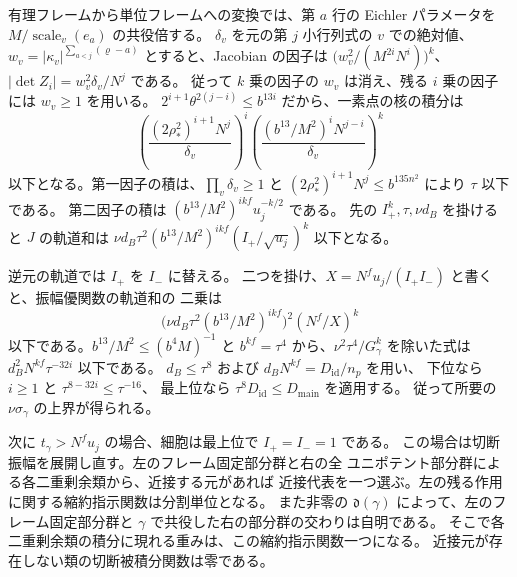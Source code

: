 有理フレームから単位フレームへの変換では、第 \(a\) 行の
Eichler パラメータを \(M/\operatorname{scale}_v(e_a)\) の共役倍する。
\(\delta_v\) を元の第 \(j\) 小行列式の \(v\) での絶対値、
\(w_v=|\kappa_v|^{\sum_{a<j}(\varrho-a)}\) とすると、Jacobian の因子は
\(\bigl(w_v^2/(M^{2i}N^i)\bigr)^k\)、\(|\det Z_i|=w_v^2\delta_v/N^j\) である。
従って \(k\) 乗の因子の \(w_v\) は消え、残る \(i\) 乗の因子には
\(w_v\ge1\) を用いる。
\(2^{i+1}\theta^{2(j-i)}\le b^{13i}\) だから、一素点の核の積分は
\[
 \left(\frac{(2\rho_\ast^2)^{i+1}N^j}{\delta_v}\right)^i
 \left(\frac{(b^{13}/M^2)^i N^{j-i}}{\delta_v}\right)^k
\]
以下となる。第一因子の積は、\(\prod_v\delta_v\ge1\) と
\((2\rho_\ast^2)^{i+1}N^j\le b^{135n^2}\) により \(\tau\) 以下である。
第二因子の積は \((b^{13}/M^2)^{ikf}u_j^{-k/2}\) である。
先の \(I_+^k,\tau,\nu d_B\) を掛けると \(J\) の軌道和は
\(\nu d_B\tau^2(b^{13}/M^2)^{ikf}(I_+/\sqrt{u_j})^k\) 以下となる。

逆元の軌道では \(I_+\) を \(I_-\) に替える。
二つを掛け、\(X=N^fu_j/(I_+I_-)\) と書くと、振幅優関数の軌道和の
二乗は
\[
  \bigl(\nu d_B\tau^2(b^{13}/M^2)^{ikf}\bigr)^2(N^f/X)^k
\]
以下である。\(b^{13}/M^2\le(b^4M)^{-1}\) と
\(b^{kf}=\tau^4\) から、\(\nu^2\tau^4/G_\gamma^k\) を除いた式は
\(d_B^2N^{kf}\tau^{-32i}\) 以下である。
\(d_B\le\tau^8\) および \(d_B N^{kf}=D_{\mathrm{id}}/n_p\) を用い、
下位なら \(i\ge1\) と \(\tau^{8-32i}\le\tau^{-16}\)、
最上位なら \(\tau^8D_{\mathrm{id}}\le D_{\mathrm{main}}\) を適用する。
従って所要の \(\nu\sigma_\gamma\) の上界が得られる。

次に \(t_\gamma>N^fu_j\) の場合、細胞は最上位で \(I_+=I_-=1\) である。
この場合は切断振幅を展開し直す。左のフレーム固定部分群と右の全
ユニポテント部分群による各二重剰余類から、近接する元があれば
近接代表を一つ選ぶ。左の残る作用に関する縮約指示関数は分割単位となる。
また非零の \(\mathfrak d(\gamma)\) によって、左のフレーム固定部分群と
\(\gamma\) で共役した右の部分群の交わりは自明である。
そこで各二重剰余類の積分に現れる重みは、この縮約指示関数一つになる。
近接元が存在しない類の切断被積分関数は零である。

